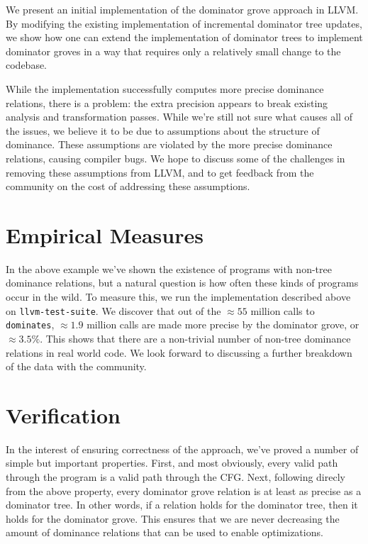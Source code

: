 \documentclass[a4paper,twocolumn]{article}
\begin{document}
We present an initial implementation of the dominator grove approach in LLVM.
By modifying the existing implementation of incremental dominator tree updates,
we show how one can extend the implementation of dominator trees to implement
dominator groves in a way that requires only a relatively small change to the
codebase.\cite{georgiadis2012experimental}

While the implementation successfully computes more precise dominance
relations, there is a problem: the extra precision appears to break existing
analysis and transformation passes. While we're still not sure what causes all
of the issues, we believe it to be due to assumptions about the structure of
dominance. These assumptions are violated by the more precise dominance
relations, causing compiler bugs. We hope to discuss some of the challenges in
removing these assumptions from LLVM, and to get feedback from the community on
the cost of addressing these assumptions.

\section*{Empirical Measures}
In the above example we've shown the existence of programs with non-tree
dominance relations, but a natural question is how often these kinds of
programs occur in the wild. To measure this, we run the implementation
described above on \texttt{llvm-test-suite}. We discover that out of the
$\approx55$ million calls to \texttt{dominates}, $\approx1.9$ million calls are made
more precise by the dominator grove, or $\approx3.5\%$. This shows that there are
a non-trivial number of non-tree dominance relations in real world code. We
look forward to discussing a further breakdown of the data with the community.

\section*{Verification}
In the interest of ensuring correctness of the approach, we've proved a number
of simple but important properties. First, and most obviously, every valid path 
through the program is a valid path through the CFG. Next, following direcly
from the above property, every dominator grove relation is at least as precise 
as a dominator tree. In other words, if a relation holds for the dominator tree, 
then it holds for the dominator grove. This ensures that we are never
decreasing the amount of dominance relations that can be used to enable
optimizations.
\end{document}
